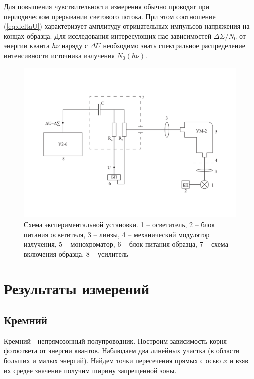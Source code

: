 \documentclass[a4paper,12pt]{article} %
\begin{document}
    Для повышения чувствительности измерения обычно проводят при периодическом прерывании светового потока. При этом соотношение (\ref{eq:deltaU}) характеризует амплитуду отрицательных импульсов напряжения на концах образца. Для исследования интересующих нас зависимостей $\Delta\Sigma/N_0$ от энергии кванта $h\nu$ наряду с $\Delta U$ необходимо знать спектральное распределение интенсивности источника излучения $N_0(h\nu)$.
    \begin{figure}[!htb]
        \centering
        \includegraphics[width=\textwidth]{exp_scheme.pdf}
        \caption{Схема экспериментальной установки. 1 -- осветитель, 2 -- блок питания осветителя, 3 -- линзы, 4 -- механический модулятор излучения, 5 -- монохроматор, 6 -- блок питания образца, 7 -- схема включения образца, 8 -- усилитель}
    \end{figure}

\newpage

\section{Результаты измерений}




\subsection{Кремний}
Кремний - непрямозонный полупроводник. Построим зависимость корня фотоответа от энергии 
квантов. Наблюдаем два линейных участка (в области больших и малых энергий).
Найдем точки пересечения прямых с осью $x$ и взяв их средее значение получим ширину запрещенной зоны.
\end{document}
